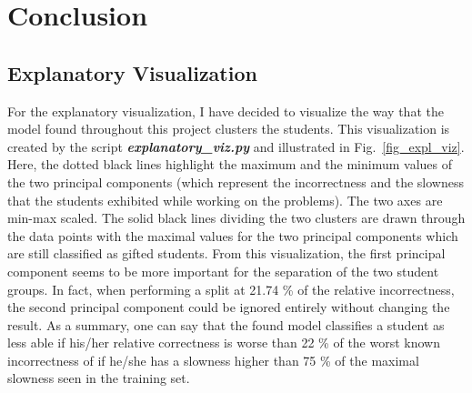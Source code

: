 \section{Conclusion}

\subsection{Explanatory Visualization}

For the explanatory visualization, I have decided to visualize the way that the model found throughout this project clusters the students. This visualization is created by the script \textbf{\emph{explanatory\_viz.py}} and illustrated in Fig.~\ref{fig_expl_viz}. Here, the dotted black lines highlight the maximum and the minimum values of the two principal components (which represent the incorrectness and the slowness that the students exhibited while working on the problems). The two axes are min-max scaled. The solid black lines dividing the two clusters are drawn through the data points with the maximal values for the two principal components which are still classified as gifted students. From this visualization, the first principal component seems to be more important for the separation of the two student groups. In fact, when performing a split at 21.74 \% of the relative incorrectness, the second principal component could be ignored entirely without changing the result. As a summary, one can say that the found model classifies a student as less able if his/her relative correctness is worse than 22 \% of the worst known incorrectness of if he/she has a slowness higher than 75 \% of the maximal slowness seen in the training set.

